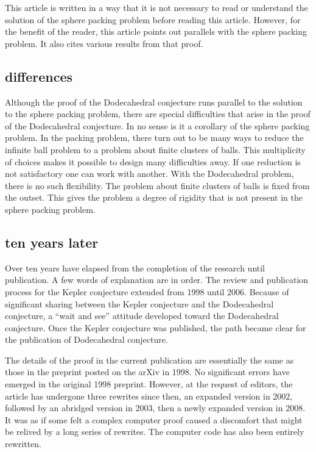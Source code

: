 This article is written in a way that it is not necessary to
read or understand the solution of the sphere packing problem before
reading this article.  However, for the benefit of the reader,
this article points  out
parallels with the sphere packing problem.  It also cites various results
from that proof.



\subsection{differences}

Although the proof of the Dodecahedral conjecture runs parallel
to the solution to the sphere packing problem, there are special
difficulties that arise in the proof of the Dodecahedral conjecture.
In no sense is it a corollary of the sphere packing problem.
In the packing problem, there turn out to be many ways to
reduce the infinite ball problem to a problem about finite clusters
of balls.  This multiplicity of choices makes it
possible to design many difficulties away.  If one reduction is
not satisfactory one can work with
another.
With the Dodecahedral problem, there is no such flexibility.
The problem about finite clusters of balls is fixed from the outset.
This gives the problem a degree of rigidity that is not present
in the sphere packing problem.


\subsection{ten years later}

Over ten years have elapsed from the completion of the research until 
publication.  A few words of explanation are in order.
The review and 
publication process for the Kepler conjecture extended from 1998
until 2006.  Because of significant sharing between the Kepler conjecture
and the Dodecahedral conjecture, a ``wait and see''
attitude developed toward the Dodecahedral conjecture.  Once the Kepler conjecture
was published, the path became clear for the publication of Dodecahedral
conjecture.  

The details of the proof in the current publication are essentially the
same as those in the preprint posted on the arXiv in 1998.  No
significant errors have emerged in the original 1998 preprint.   However,
at the request of editors,
the article has undergone three rewrites since then, an expanded version in 2002, followed by an abridged version in 2003, then a newly expanded version in 2008.  It was as if some felt a complex computer proof caused a discomfort that might be relived by a long series of
rewrites. The computer code has
also been entirely rewritten.

